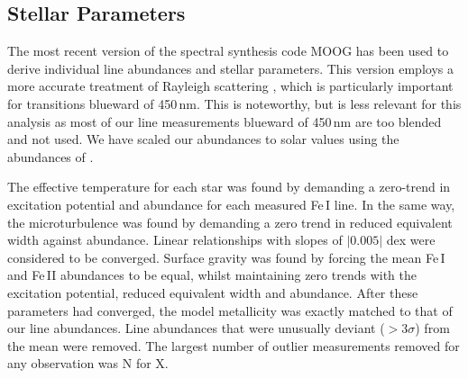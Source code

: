 \documentclass{emulateapj}
\begin{document}
\subsection{Stellar Parameters}
The most recent version of the spectral synthesis code MOOG \citep{Sneden;et-al_1973} has been used to derive individual line abundances and stellar parameters. This version employs a more accurate treatment of Rayleigh scattering \citet{Sobeck;et-al_2011}, which is particularly important for transitions blueward of 450\,nm. This is noteworthy, but is less relevant for this analysis as most of our line measurements blueward of 450\,nm are too blended and not used. We have scaled our abundances to solar values using the abundances of \citet{Asplund;et-al_2009}.

The effective temperature for each star was found by demanding a zero-trend in excitation potential and abundance for each measured Fe\,I line. In the same way, the microturbulence was found by demanding a zero trend in reduced equivalent width against abundance. Linear relationships with slopes of $|0.005|$ dex were considered to be converged. Surface gravity was found by forcing the mean Fe\,I and Fe\,II abundances to be equal, whilst maintaining zero trends with the excitation potential, reduced equivalent width and abundance. After these parameters had converged, the model metallicity was exactly matched to that of our line abundances. Line abundances that were unusually deviant ($>3\sigma$) from the mean were removed. The largest number of outlier measurements removed for any observation was N for X.


\end{document}
